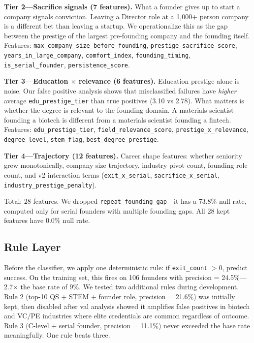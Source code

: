 \documentclass[10pt, conference]{IEEEtran}
\begin{document}
\textbf{Tier 2---Sacrifice signals (7 features).} What a founder gives up to start a company signals conviction. Leaving a Director role at a 1,000+ person company is a different bet than leaving a startup. We operationalize this as the gap between the prestige of the largest pre-founding company and the founding itself. Features: \texttt{max\_company\_size\_before\_founding}, \texttt{prestige\_sacrifice\_score}, \texttt{years\_in\_large\_company}, \texttt{comfort\_index}, \texttt{founding\_timing}, \texttt{is\_serial\_founder}, \texttt{persistence\_score}.

\textbf{Tier 3---Education $\times$ relevance (6 features).} Education prestige alone is noise. Our false positive analysis shows that misclassified failures have \textit{higher} average \texttt{edu\_prestige\_tier} than true positives (3.10 vs 2.78). What matters is whether the degree is relevant to the founding domain. A materials scientist founding a biotech is different from a materials scientist founding a fintech. Features: \texttt{edu\_prestige\_tier}, \texttt{field\_relevance\_score}, \texttt{prestige\_x\_relevance}, \texttt{degree\_level}, \texttt{stem\_flag}, \texttt{best\_degree\_prestige}.

\textbf{Tier 4---Trajectory (12 features).} Career shape features: whether seniority grew monotonically, company size trajectory, industry pivot count, founding role count, and v2 interaction terms (\texttt{exit\_x\_serial}, \texttt{sacrifice\_x\_serial}, \texttt{industry\_prestige\_penalty}).

Total: 28 features. We dropped \texttt{repeat\_founding\_gap}---it has a 73.8\% null rate, computed only for serial founders with multiple founding gaps. All 28 kept features have 0.0\% null rate.

\subsection{Rule Layer}

Before the classifier, we apply one deterministic rule: if \texttt{exit\_count} $> 0$, predict success. On the training set, this fires on 106 founders with precision = 24.5\%---2.7$\times$ the base rate of 9\%. We tested two additional rules during development. Rule 2 (top-10 QS + STEM + founder role, precision = 21.6\%) was initially kept, then disabled after val analysis showed it amplifies false positives in biotech and VC/PE industries where elite credentials are common regardless of outcome. Rule 3 (C-level + serial founder, precision = 11.1\%) never exceeded the base rate meaningfully. One rule beats three.
\end{document}
